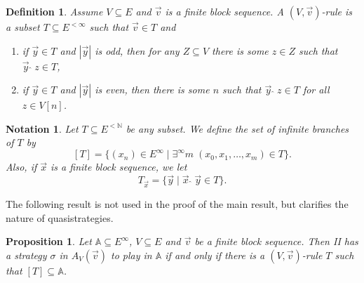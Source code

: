\documentclass[10pt]{amsart}
\newcommand {\A}{\mathbb A}
\newcommand {\N}{\mathbb N}
\newcommand{\con}{\;\hat{}\;}
\newcommand {\del}{ \; \big| \;}
\newcommand {\e} {\exists}
\newtheorem{prop} [thm] {Proposition}
\newtheorem{defi} [thm] {Definition}
\newtheorem{nota}[thm]{Notation}
\theoremstyle{definition}
\begin{document}
\begin{defi}
Assume $V\subseteq E$ and $\vec v$ is a finite block sequence. A {\em $(V,\vec v)$-rule}  is a subset  $T\subseteq E^{<\infty}$ such that $\vec v \in T$ and 
\begin{enumerate}
\item[(i)] if $\vec y\in T$ and $|\vec y|$ is odd, then for any $Z\subseteq V$ there is some $z\in Z$ such that $\vec y\con z\in T$,
\item[(ii)] if $\vec y\in T$ and $|\vec y|$ is even, then there is some $n$ such that $\vec y\con z\in T$ for all $z\in V[n]$.
\end{enumerate}
\end{defi}







\begin{nota}
Let $T\subseteq E^{<\N}$ be any subset. We define the set of {\em infinite branches} of $T$ by
$$
[T]=\{(x_n)\in E^\infty\del \e^\infty m\;(x_0,x_1,\ldots,x_m)\in T\}.
$$
Also, if $\vec x$ is a finite block sequence, we let 
$$
T_{\vec x}=\{\vec y\del \vec x\con \vec y\in T\}.
$$
\end{nota}





The following result is not used in the proof of the main result, but clarifies the nature of quasistrategies. 

\begin{prop}\label{quasistrategy}
Let $\A\subseteq E^\infty$, $V\subseteq E$ and $\vec v$ be a finite block sequence. Then II has a strategy $\sigma$ in $A_V(\vec v)$ to play in $\A$ if and only if there is a $(V,\vec v)$-rule $T$  such that $[T]\subseteq \A$.
\end{prop}
\end{document}
